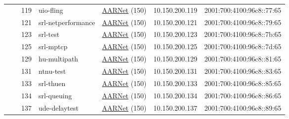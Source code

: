 \begin{small}
\begin{center}
\begin{longtable}{|c|c|c|c|c|c|c|c|}
  &  & \tiny{119} & \multicolumn{1}{|l|}{\tiny{uio-fling}} & \multicolumn{2}{|c|}{\tiny{\href{https://www.aarnet.edu.au/}{AARNet} (150)}} & \tiny{10.150.200.119} & \tiny{2001:700:4100:96c8::77:65} \\* \cline{3-3}\cline{4-4}\cline{5-5}\cline{6-6}\cline{7-7}\cline{8-8}
  &  & \tiny{121} & \multicolumn{1}{|l|}{\tiny{srl-netperformance}} & \multicolumn{2}{|c|}{\tiny{\href{https://www.aarnet.edu.au/}{AARNet} (150)}} & \tiny{10.150.200.121} & \tiny{2001:700:4100:96c8::79:65} \\* \cline{3-3}\cline{4-4}\cline{5-5}\cline{6-6}\cline{7-7}\cline{8-8}
  &  & \tiny{123} & \multicolumn{1}{|l|}{\tiny{srl-test}} & \multicolumn{2}{|c|}{\tiny{\href{https://www.aarnet.edu.au/}{AARNet} (150)}} & \tiny{10.150.200.123} & \tiny{2001:700:4100:96c8::7b:65} \\* \cline{3-3}\cline{4-4}\cline{5-5}\cline{6-6}\cline{7-7}\cline{8-8}
  &  & \tiny{125} & \multicolumn{1}{|l|}{\tiny{srl-mptcp}} & \multicolumn{2}{|c|}{\tiny{\href{https://www.aarnet.edu.au/}{AARNet} (150)}} & \tiny{10.150.200.125} & \tiny{2001:700:4100:96c8::7d:65} \\* \cline{3-3}\cline{4-4}\cline{5-5}\cline{6-6}\cline{7-7}\cline{8-8}
  &  & \tiny{129} & \multicolumn{1}{|l|}{\tiny{hu-multipath}} & \multicolumn{2}{|c|}{\tiny{\href{https://www.aarnet.edu.au/}{AARNet} (150)}} & \tiny{10.150.200.129} & \tiny{2001:700:4100:96c8::81:65} \\* \cline{3-3}\cline{4-4}\cline{5-5}\cline{6-6}\cline{7-7}\cline{8-8}
  &  & \tiny{131} & \multicolumn{1}{|l|}{\tiny{ntnu-test}} & \multicolumn{2}{|c|}{\tiny{\href{https://www.aarnet.edu.au/}{AARNet} (150)}} & \tiny{10.150.200.131} & \tiny{2001:700:4100:96c8::83:65} \\* \cline{3-3}\cline{4-4}\cline{5-5}\cline{6-6}\cline{7-7}\cline{8-8}
  &  & \tiny{133} & \multicolumn{1}{|l|}{\tiny{srl-thuen}} & \multicolumn{2}{|c|}{\tiny{\href{https://www.aarnet.edu.au/}{AARNet} (150)}} & \tiny{10.150.200.133} & \tiny{2001:700:4100:96c8::85:65} \\* \cline{3-3}\cline{4-4}\cline{5-5}\cline{6-6}\cline{7-7}\cline{8-8}
  &  & \tiny{134} & \multicolumn{1}{|l|}{\tiny{srl-queuing}} & \multicolumn{2}{|c|}{\tiny{\href{https://www.aarnet.edu.au/}{AARNet} (150)}} & \tiny{10.150.200.134} & \tiny{2001:700:4100:96c8::86:65} \\* \cline{3-3}\cline{4-4}\cline{5-5}\cline{6-6}\cline{7-7}\cline{8-8}
  &  & \tiny{137} & \multicolumn{1}{|l|}{\tiny{ude-delaytest}} & \multicolumn{2}{|c|}{\tiny{\href{https://www.aarnet.edu.au/}{AARNet} (150)}} & \tiny{10.150.200.137} & \tiny{2001:700:4100:96c8::89:65} \\* \cline{3-3}\cline{4-4}\cline{5-5}\cline{6-6}\cline{7-7}\cline{8-8}

\end{longtable}
\end{center}
\end{small}
